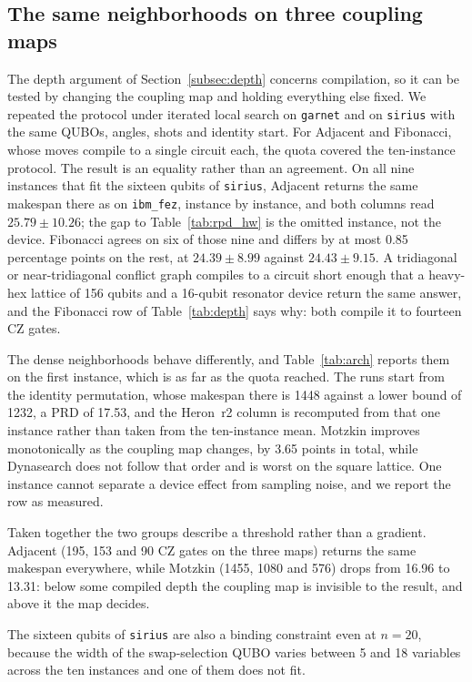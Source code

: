 \documentclass{svproc}
\begin{document}
\subsection{The same neighborhoods on three coupling maps}
\label{subsec:arch}
The depth argument of Section~\ref{subsec:depth} concerns compilation, so it
can be tested by changing the coupling map and holding everything else fixed.
We repeated the protocol under iterated local search on \texttt{garnet} and
on \texttt{sirius} with the same QUBOs, angles, shots and identity start.
For Adjacent and Fibonacci, whose moves compile to a single circuit each, the
quota covered the ten-instance protocol. The result is an equality rather than
an agreement. On all nine instances that fit the sixteen qubits of
\texttt{sirius}, Adjacent returns the same makespan there as on
\texttt{ibm\_fez}, instance by instance, and both columns read $25.79 \pm 10.26$;
the gap to Table~\ref{tab:rpd_hw} is the omitted instance, not the device.
Fibonacci agrees on six of those nine and differs by at most 0.85 percentage
points on the rest, at $24.39 \pm 8.99$ against $24.43 \pm 9.15$. A
tridiagonal or near-tridiagonal conflict graph compiles to a circuit short
enough that a heavy-hex lattice of 156 qubits and a 16-qubit resonator device
return the same answer, and the Fibonacci row of Table~\ref{tab:depth} says
why: both compile it to fourteen CZ gates.

The dense neighborhoods behave differently, and Table~\ref{tab:arch} reports
them on the first instance, which is as far as the quota reached. The runs
start from the identity permutation, whose makespan there is 1448 against a
lower bound of 1232, a PRD of 17.53, and the Heron~r2 column is recomputed
from that one instance rather than taken from the ten-instance mean. Motzkin
improves monotonically as the coupling map changes, by 3.65 points in total,
while Dynasearch does not follow that order and is worst on the square
lattice. One instance cannot separate a device effect from sampling noise, and
we report the row as measured.

Taken together the two groups describe a threshold rather than a gradient.
Adjacent (195, 153 and 90 CZ gates on the three maps) returns the same makespan
everywhere, while Motzkin (1455, 1080 and 576) drops from 16.96 to 13.31: below
some compiled depth the coupling map is invisible to the result, and above it
the map decides.

The sixteen qubits of \texttt{sirius} are also a binding constraint even at
$n=20$, because the width of the swap-selection QUBO varies between 5 and 18
variables across the ten instances and one of them does not fit.
\end{document}
